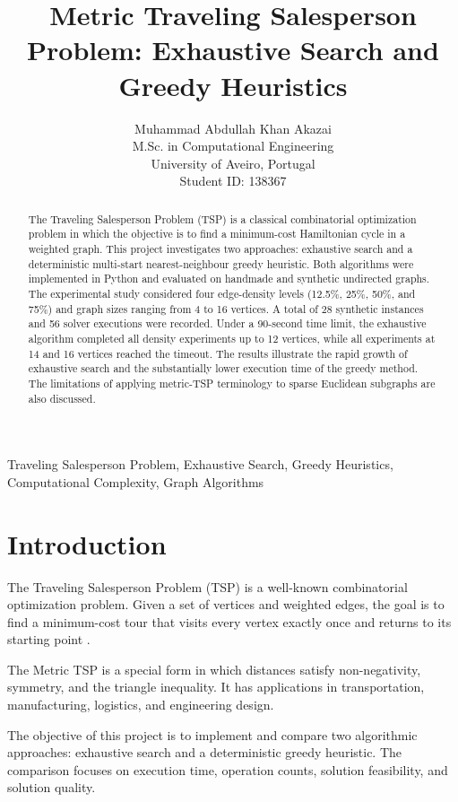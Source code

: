 \documentclass[english,times,final,mirror,longpaper]{revdetua}
\title{Metric Traveling Salesperson Problem: Exhaustive Search and Greedy Heuristics}
\author{
Muhammad Abdullah Khan Akazai\\
M.Sc. in Computational Engineering\\
University of Aveiro, Portugal\\
Student ID: 138367
}
\begin{document}
\maketitle

\begin{abstract}
The Traveling Salesperson Problem (TSP) is a classical combinatorial
optimization problem in which the objective is to find a minimum-cost
Hamiltonian cycle in a weighted graph. This project investigates two
approaches: exhaustive search and a deterministic multi-start
nearest-neighbour greedy heuristic. Both algorithms were implemented
in Python and evaluated on handmade and synthetic undirected graphs.
The experimental study considered four edge-density levels
(12.5\%, 25\%, 50\%, and 75\%) and graph sizes ranging from 4 to
16 vertices. A total of 28 synthetic instances and 56 solver
executions were recorded. Under a 90-second time limit, the
exhaustive algorithm completed all density experiments up to
12 vertices, while all experiments at 14 and 16 vertices reached
the timeout. The results illustrate the rapid growth of exhaustive
search and the substantially lower execution time of the greedy
method. The limitations of applying metric-TSP terminology to
sparse Euclidean subgraphs are also discussed.
\end{abstract}

\begin{keywords}
Traveling Salesperson Problem, Exhaustive Search, Greedy Heuristics,
Computational Complexity, Graph Algorithms
\end{keywords}

\section{Introduction}

The Traveling Salesperson Problem (TSP) is a well-known
combinatorial optimization problem. Given a set of vertices and
weighted edges, the goal is to find a minimum-cost tour that visits
every vertex exactly once and returns to its starting point
\cite{applegate2006}.

The Metric TSP is a special form in which distances satisfy
non-negativity, symmetry, and the triangle inequality. It has
applications in transportation, manufacturing, logistics, and
engineering design.

The objective of this project is to implement and compare two
algorithmic approaches: exhaustive search and a deterministic
greedy heuristic. The comparison focuses on execution time,
operation counts, solution feasibility, and solution quality.
\end{document}
